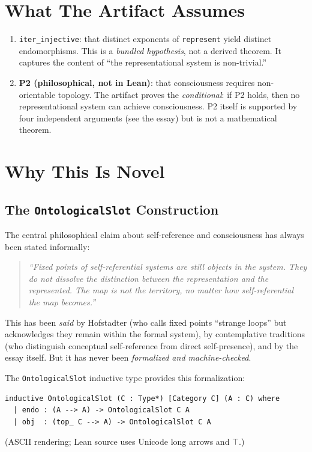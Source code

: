 \documentclass[11pt]{article}
\begin{document}
\section{What The Artifact Assumes}

\begin{enumerate}
\item \texttt{iter\_injective}: that distinct exponents of \texttt{represent} yield
  distinct endomorphisms. This is a \emph{bundled hypothesis}, not a derived
  theorem. It captures the content of ``the representational system is non-trivial.''
\item \textbf{P2 (philosophical, not in Lean)}: that consciousness requires
  non-orientable topology. The artifact proves the \emph{conditional}: if P2 holds,
  then no representational system can achieve consciousness. P2 itself is supported
  by four independent arguments (see the essay) but is not a mathematical theorem.
\end{enumerate}

\section{Why This Is Novel}
\label{sec:novel}

\subsection{The \texttt{OntologicalSlot} Construction}
\label{sec:ontoslot}

The central philosophical claim about self-reference and consciousness has always
been stated informally:

\begin{quote}
\emph{``Fixed points of self-referential systems are still objects in the system.
They do not dissolve the distinction between the representation and the represented.
The map is not the territory, no matter how self-referential the map becomes.''}
\end{quote}

This has been \emph{said} by Hofstadter (who calls fixed points ``strange loops''
but acknowledges they remain within the formal system), by contemplative traditions
(who distinguish conceptual self-reference from direct self-presence), and by
the essay itself. But it has never been \emph{formalized and machine-checked}.

The \texttt{OntologicalSlot} inductive type provides this formalization:

\begin{verbatim}
inductive OntologicalSlot (C : Type*) [Category C] (A : C) where
  | endo : (A --> A) -> OntologicalSlot C A
  | obj  : (top_ C --> A) -> OntologicalSlot C A
\end{verbatim}
\noindent (ASCII rendering; Lean source uses Unicode long arrows and $\top$.)
\end{document}

